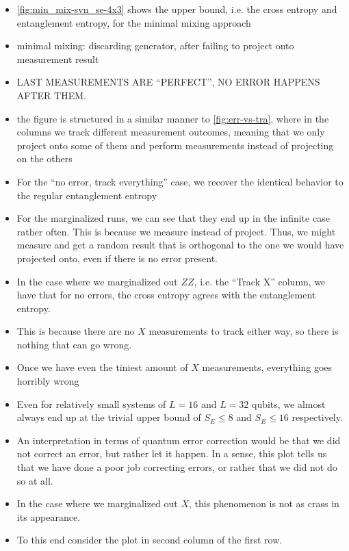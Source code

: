 \begin{itemize}
  \item \cref{fig:min_mix-svn_se-4x3} shows the upper bound, i.e. the cross
    entropy and entanglement entropy, for the minimal mixing approach
  \item minimal mixing: discarding generator, after failing to project onto
    measurement result
  \item LAST MEASUREMENTS ARE \enquote{PERFECT}, NO ERROR HAPPENS AFTER THEM.
  \item the figure is structured in a similar manner to \cref{fig:err-vs-tra},
    where in the columns we track different measurement outcomes, meaning that
    we only project onto some of them and perform measurements instead of
    projecting on the others
  \item For the \enquote{no error, track everything} case, we recover the
    identical behavior to the regular entanglement entropy
  \item For the marginalized runs, we can see that they end up in the infinite
    case rather often. This is because we measure instead of project. Thus, we
    might measure and get a random result that is orthogonal to the one we
    would have projected onto, even if there is no error present.
  \item In the case where we marginalized out $ZZ$, i.e. the \enquote{Track X}
    column, we have that for no errors, the cross entropy agrees with the
    entanglement entropy.
  \item This is because there are no $X$ measurements to track either way, so
    there is nothing that can go wrong.
  \item Once we have even the tiniest amount of $X$ measurements, everything
    goes horribly wrong
  \item Even for relatively small systems of $L=16$ and $L=32$ qubits, we
    almost always end up at the trivial upper bound of $S_E \leq 8$ and $S_E
    \leq 16$ respectively. 
  \item An interpretation in terms of quantum error correction would be that we
    did not correct an error, but rather let it happen. In a sense, this plot
    tells us that we have done a poor job correcting errors, or rather that we
    did not do so at all.
  \item In the case where we marginalized out $X$, this phenomenon is not as
    crass in its appearance. 
  \item To this end consider the plot in second column of the first row.

\end{itemize}
